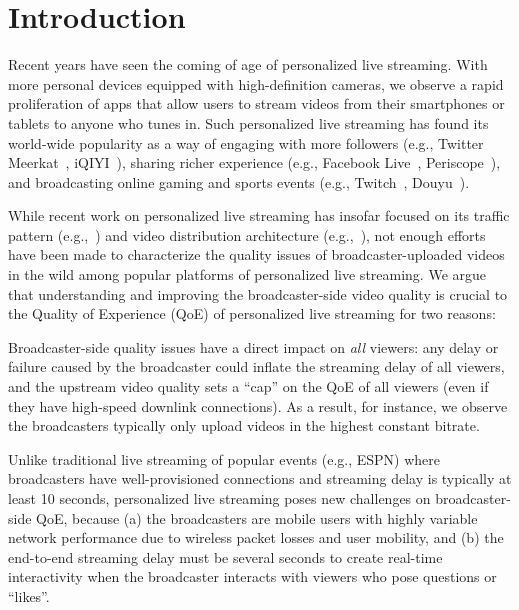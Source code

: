 \section{Introduction}


Recent years have seen the coming of age of personalized live
streaming. With more personal devices equipped with high-definition
cameras, we observe a rapid proliferation of apps that allow users
to stream videos from their smartphones or tablets to anyone who
tunes in. Such personalized live streaming has found its world-wide
popularity as a way of engaging with more followers (e.g., Twitter Meerkat~\cite{twitter}, iQIYI~\cite{iqiyi}),
sharing richer experience (e.g., Facebook Live~\cite{facebook}, Periscope~\cite{periscope}),
and broadcasting online gaming and sports events (e.g., Twitch~\cite{twitch}, Douyu~\cite{douyu}).


While recent work on personalized live streaming has insofar
focused on its traffic pattern (e.g.,~\cite{zhang2015crowdsourced,tang2016meerkat})
and video distribution architecture (e.g.,~\cite{siekkinen2016first,wang2016anatomy}),
not enough efforts have been made to characterize the
quality issues of broadcaster-uploaded videos in the wild among popular platforms of
personalized live streaming.
We argue that understanding and improving the broadcaster-side
video quality is crucial to the Quality of Experience (QoE) of personalized live streaming for two reasons:
\begin{packedenumerate}
\item Broadcaster-side quality issues
have a direct impact on {\em all} viewers:
any delay or failure caused by the broadcaster could inflate the
streaming delay of all viewers, and the upstream video quality
sets a ``cap'' on the QoE of all
viewers (even if they have high-speed downlink connections).
As a result, for instance, we observe
the broadcasters typically only upload videos in the highest constant
bitrate.
\item Unlike traditional live streaming of popular events
(e.g., ESPN) where broadcasters have well-provisioned
connections and streaming delay is typically at least 10 seconds,
personalized live streaming poses new challenges on
broadcaster-side QoE, because
(a) the broadcasters are mobile users with highly variable
network performance due to wireless packet losses and
user mobility, and
(b) the end-to-end streaming delay must be
several seconds to create real-time interactivity when
the broadcaster interacts with viewers who pose questions
or ``likes''.
\end{packedenumerate}

